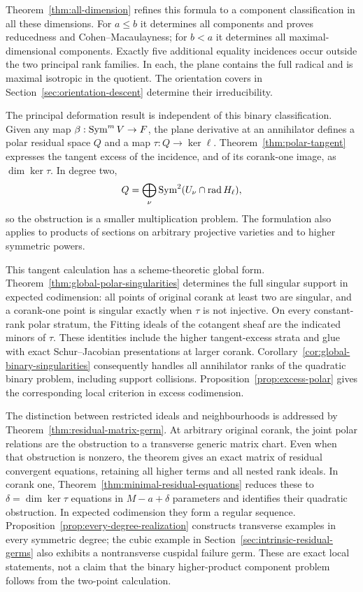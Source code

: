 Theorem~\ref{thm:all-dimension} refines this formula to a component
classification in all these dimensions. For $a\le b$ it determines
all components and proves reducedness and Cohen--Macaulayness; for
$b<a$ it determines all maximal-dimensional components. Exactly five
additional equality incidences occur outside the two principal rank
families. In each, the plane contains the full radical and is maximal
isotropic in the quotient. The orientation covers in
Section~\ref{sec:orientation-descent} determine their irreducibility.

The principal deformation result is independent of this binary
classification. Given any map $\beta:\operatorname{Sym}^m V\to F$, the plane
derivative at an annihilator defines a polar residual space $Q$ and
a map $\tau:Q\to\ker\ell$. Theorem~\ref{thm:polar-tangent}
expresses the tangent excess of the incidence, and of its corank-one
image, as $\dim\ker\tau$. In degree two,
\[
 Q=\bigoplus_\nu\operatorname{Sym}^2(U_\nu\cap\operatorname{rad}H_\ell),
\]
so the obstruction is a smaller multiplication problem. The formulation
also applies to products of sections on arbitrary projective varieties
and to higher symmetric powers.

This tangent calculation has a scheme-theoretic global form.
Theorem~\ref{thm:global-polar-singularities} determines the full
singular support in expected codimension: all points of original
corank at least two are singular, and a corank-one point is singular
exactly when $\tau$ is not injective. On every constant-rank polar
stratum, the Fitting ideals of the cotangent sheaf are the indicated
minors of $\tau$. These identities include the higher tangent-excess
strata and glue with exact Schur--Jacobian presentations at larger
corank. Corollary~\ref{cor:global-binary-singularities} consequently
handles all annihilator ranks of the quadratic binary problem,
including support collisions. Proposition~\ref{prop:excess-polar}
gives the corresponding local criterion in excess codimension.

The distinction between restricted ideals and neighbourhoods is addressed
by Theorem~\ref{thm:residual-matrix-germ}. At arbitrary original corank,
the joint polar relations are the obstruction to a transverse generic
matrix chart. Even when that obstruction is nonzero, the theorem gives
an exact matrix of residual convergent equations, retaining all higher
terms and all nested rank ideals. In corank one,
Theorem~\ref{thm:minimal-residual-equations} reduces these to
$\delta=\dim\ker\tau$ equations in $M-a+\delta$ parameters and
identifies their quadratic obstruction. In expected codimension they
form a regular sequence. Proposition~\ref{prop:every-degree-realization}
constructs transverse examples in every symmetric degree; the cubic
example in Section~\ref{sec:intrinsic-residual-germs} also exhibits a
nontransverse cuspidal failure germ. These are exact local statements,
not a claim that the binary higher-product component problem follows
from the two-point calculation.

